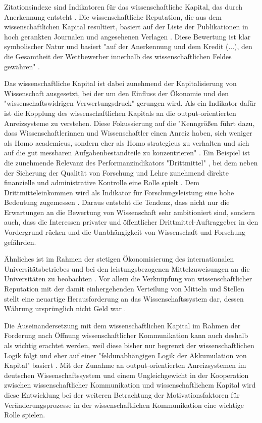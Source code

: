 Zitationsindexe sind Indikatoren für das wissenschaftliche Kapital, das durch Anerkennung entsteht \cite{Bourdieu_1998}. Die wissenschaftliche Reputation, die aus dem wissenschaftlichen Kapital resultiert, basiert auf der Liste der Publikationen in hoch gerankten Journalen und angesehenen Verlagen \cite{Herb_2010}. Diese Bewertung ist klar symbolischer Natur und basiert "auf der Anerkennung und dem Kredit (...), den die Gesamtheit der Wettbewerber innerhalb des wissenschaftlichen Feldes gewähren" \cite{Bourdieu_1998} \cite{Barloesius_2008} \cite{Herb_2010}.

Das wissenschaftliche Kapital ist dabei zunehmend der Kapitalisierung von Wissenschaft ausgesetzt, bei der um den Einfluss der Ökonomie und den "wissenschaftswidrigen Verwertungsdruck" \cite[:12]{Neidhardt_2006} gerungen wird. Als ein Indikator dafür ist die Kopplung des wissenschaftlichen Kapitals an die output-orientierten Anreizsysteme zu verstehen. Diese Fokussierung auf die "Kenngrößen führt dazu, dass Wissenschaftlerinnen und Wissenschaftler einen Anreiz haben, sich weniger als Homo academicus, sondern eher als Homo strategicus zu verhalten und sich auf die gut messbaren Aufgabenbestandteile zu konzentrieren" \cite{Frost_2014}. Ein Beispiel ist die zunehmende Relevanz des Performanzindikators "Drittmittel" \cite{Fabrizio_2008} \cite{Jansen_2007}, bei dem neben der Sicherung der Qualität von Forschung und Lehre zunehmend direkte finanzielle und administrative Kontrolle eine Rolle spielt \cite{Barloesius_2008}. Dem Drittmitteleinkommen wird als Indikator für Forschungsleistung eine hohe Bedeutung zugemessen \cite{Jansen_2007}. Daraus entsteht die Tendenz, dass nicht nur die Erwartungen an die Bewertung von Wissenschaft sehr ambitioniert sind, sondern auch, dass die Interessen privater und öffentlicher Drittmittel-Auftraggeber in den Vordergrund rücken und die Unabhängigkeit von Wissenschaft und Forschung gefährden.

Ähnliches ist im Rahmen der stetigen Ökonomisierung des internationalen Universitätsbetriebes \cite{Brembs_2015} und bei den leistungsbezogenen Mittelzuweisungen an die Universitäten zu beobachten \cite[:12]{Neidhardt_2006}. Vor allem die Verknüpfung von wissenschaftlicher Reputation mit der damit einhergehenden Verteilung von Mitteln und Stellen stellt eine neuartige Herausforderung an das Wissenschaftssystem dar, dessen Währung ursprünglich nicht Geld war \cite{Hanekop_2006} \cite[:15]{Buss_2001}.

Die Auseinandersetzung mit dem wissenschaftlichen Kapital im Rahmen der Forderung nach Öffnung wissenschaftlicher Kommunikation kann auch deshalb als wichtig erachtet werden, weil diese bisher nur begrenzt der wissenschaftlichen Logik folgt und eher auf einer "feldunabhängigen Logik der Akkumulation von Kapital" basiert \cite{Herb_2006}. Mit der Zunahme an output-orientierten Anreizsystemen im deutschen Wissenschaftssystem \cite{Osterloh_2008} und einem Ungleichgewicht in der Kooperation zwischen wissenschaftlicher Kommunikation und wissenschaftlichem Kapital wird diese Entwicklung bei der weiteren Betrachtung der Motivationsfaktoren für Veränderungsprozesse in der wissenschaftlichen Kommunikation eine wichtige Rolle spielen.

